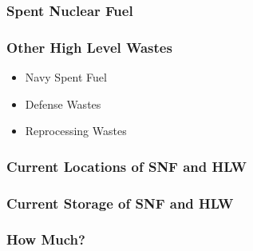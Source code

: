 
\begin{frame}[ctb!]
  \frametitle{Spent Nuclear Fuel}
  
\end{frame}

\begin{frame}[ctb!]
  \frametitle{Other High Level Wastes}
  \begin{itemize}
    \item Navy Spent Fuel
    \item Defense Wastes
    \item Reprocessing Wastes
  \end{itemize}
\end{frame}

\begin{frame}[ctb!]
  \frametitle{Current Locations of SNF and HLW}
  
\end{frame}

\begin{frame}[ctb!]
  \frametitle{Current Storage of SNF and HLW}
  
\end{frame}

\begin{frame}[ctb!]
  \frametitle{How Much?}
  
\end{frame}

